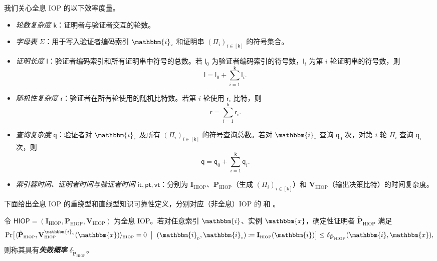 \documentclass[american,singlepageview]{snargs-book-zh}
\newcommand{\defemph}[1]{\textbf{\emph{#1}}}
\newcommand{\Malicious}[1]{\tilde{#1}}
\newcommand{\Interact}[2]{\langle #1, #2 \rangle}
\newcommand{\DefineEqual}{\coloneqq}
\newcommand{\Index}{\mathbbm{i}}
\newcommand{\Instance}{\mathbbm{x}}
\newcommand{\ProtoIndexer}{I}
\newcommand{\ProtoProver}{P}
\newcommand{\ProtoVerifier}{V}
\newcommand{\ProtoAlphabet}{\Sigma}
\newcommand{\ProtoRoundComplexity}{\mathsf{k}}
\newcommand{\ProtoProofLength}{\mathsf{l}}
\newcommand{\ProtoQueryComplexity}{\mathsf{q}}
\newcommand{\ProtoRandomnessComplexity}{\mathsf{r}}
\newcommand{\ProtoIndexerTime}{\mathsf{it}}
\newcommand{\ProtoProverTime}{\mathsf{pt}}
\newcommand{\ProtoVerifierTime}{\mathsf{vt}}
\newcommand{\RoundIndex}{i}
\newcommand{\IOPFormat}[1]{\mathbf{#1}}
\newcommand{\IOPString}{\Pi}
\newcommand{\IOPRoundComplexity}{\ProtoRoundComplexity}
\newcommand{\IOPAlphabet}{\ProtoAlphabet}
\newcommand{\IOPProofLength}{\ProtoProofLength}
\newcommand{\IOPRandomnessComplexity}{\ProtoRandomnessComplexity}
\newcommand{\IOPQueryComplexity}{\ProtoQueryComplexity}
\newcommand{\IOPProverTime}{\ProtoProverTime}
\newcommand{\IOPStrings}{(\IOPString_{\RoundIndex})_{\RoundIndex \in [\IOPRoundComplexity]}}
\newcommand{\IOPVerifierTime}{\ProtoVerifierTime}
\newcommand{\HIOPSubscript}{\scriptscriptstyle\mathrm{HIOP}}
\newcommand{\HIOPSymbol}{\mathsf{HIOP}}
\newcommand{\HIOPInteract}[2]{\Interact{#1}{#2}_{\HIOPSubscript}}
\newcommand{\HIOPIndexer}{\IOPFormat{\ProtoIndexer}_{\HIOPSubscript}}
\newcommand{\HIOPProver}{\IOPFormat{\ProtoProver}_{\HIOPSubscript}}
\newcommand{\HIOPVerifier}{\IOPFormat{\ProtoVerifier}_{\HIOPSubscript}}
\newcommand{\HIOPSystem}{(\HIOPIndexer,\HIOPProver,\HIOPVerifier)}
\newcommand{\ProverEncodedIndex}{\Index_{{\scriptscriptstyle\mathrm{p}}}}
\newcommand{\VerifierEncodedIndex}{\Index_{{\scriptscriptstyle\mathrm{v}}}}
\newcommand{\HIOPIndexerTime}{\ProtoIndexerTime}
\newcommand{\HIOPMaliciousProver}{\Malicious{\IOPFormat{\ProtoProver}}_{\HIOPSubscript}}
\newcommand{\IndexRoundSubscript}{0}
\newcommand{\ProverFailureProbability}[1]{\delta_{#1}}
\begin{document}
我们关心全息 IOP 的以下效率度量。
\begin{itemize}[nolistsep]
  \item \emph{轮数复杂度} $\IOPRoundComplexity$：证明者与验证者交互的轮数。
  \item \emph{字母表} $\IOPAlphabet$：用于写入验证者编码索引 $\VerifierEncodedIndex$ 和证明串 $\IOPStrings$ 的符号集合。
  \item \emph{证明长度} $\IOPProofLength$：验证者编码索引和所有证明串中符号的总数。若 $\IOPProofLength_{\IndexRoundSubscript}$ 为验证者编码索引的符号数，$\IOPProofLength_{\RoundIndex}$ 为第 $\RoundIndex$ 轮证明串的符号数，则
    \[
      \IOPProofLength
      =\IOPProofLength_{\IndexRoundSubscript}
       +\sum_{\RoundIndex=1}^{\IOPRoundComplexity}\IOPProofLength_{\RoundIndex}.
    \]
  \item \emph{随机性复杂度} $\IOPRandomnessComplexity$：验证者在所有轮使用的随机比特数。若第 $\RoundIndex$ 轮使用 $\IOPRandomnessComplexity_{\RoundIndex}$ 比特，则
    \[
      \IOPRandomnessComplexity
      =\sum_{\RoundIndex=1}^{\IOPRoundComplexity}\IOPRandomnessComplexity_{\RoundIndex}.
    \]
  \item \emph{查询复杂度} $\IOPQueryComplexity$：验证者对 $\VerifierEncodedIndex$ 及所有 $\IOPStrings$ 的符号查询总数。若对 $\VerifierEncodedIndex$ 查询 $\IOPQueryComplexity_{\IndexRoundSubscript}$ 次，对第 $\RoundIndex$ 轮 $\IOPString_{\RoundIndex}$ 查询 $\IOPQueryComplexity_{\RoundIndex}$ 次，则
    \[
      \IOPQueryComplexity
      =\IOPQueryComplexity_{\IndexRoundSubscript}
       +\sum_{\RoundIndex=1}^{\IOPRoundComplexity}\IOPQueryComplexity_{\RoundIndex}.
    \]
  \item \emph{索引器时间、证明者时间与验证者时间} $\HIOPIndexerTime,\IOPProverTime,\IOPVerifierTime$：分别为 $\HIOPIndexer$、$\HIOPProver$（生成 $\IOPStrings$）和 $\HIOPVerifier$（输出决策比特）的时间复杂度。
\end{itemize}

下面给出全息 IOP 的重绕型和直线型知识可靠性定义，分别对应（非全息）IOP 的  和 。

\begin{definition}
\label{definition:hiop-failure-probability}
令 $\HIOPSymbol=\HIOPSystem$ 为全息 IOP。若对任意索引 $\Index$、实例 $\Instance$，确定性证明者 $\HIOPMaliciousProver$ 满足
\[
\Pr\bigl[
  \HIOPInteract{\HIOPMaliciousProver}
             {\HIOPVerifier^{\VerifierEncodedIndex}(\Instance)}=0
\;\bigm|\;
  (\ProverEncodedIndex,\VerifierEncodedIndex)\DefineEqual\HIOPIndexer(\Index)
\bigr]
\le
\ProverFailureProbability{\HIOPMaliciousProver}(\Index,\Instance),
\]
则称其具有\defemph{失败概率} $\ProverFailureProbability{\HIOPMaliciousProver}$。
\end{definition}
\end{document}
